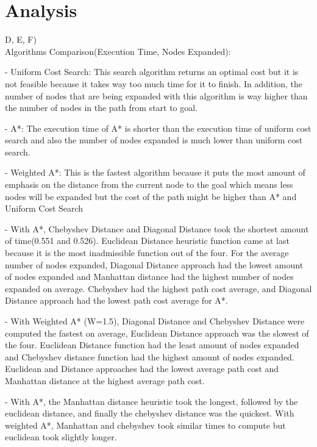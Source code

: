 \documentclass{report}
\begin{document}
    \section {Analysis}

        {\huge D, E, F)} \\
        Algorithms Comparison(Execution Time, Nodes Expanded):

        - Uniform Cost Search: This search algorithm returns an optimal cost but it is not feasible because it takes way too much time for it to finish. In addition, the number of nodes that are being expanded with this algorithm is way higher than the number of nodes in the path from start to goal.


        - A*: The execution time of A* is shorter than the execution time of uniform cost search and also the number of nodes expanded is much lower than uniform cost search.

        - Weighted A*: This is the fastest algorithm because it puts the most amount of emphasis on the distance from the current node to the goal which means less nodes will be expanded but the cost of the path might be higher than A* and Uniform Cost Search

        - With A*, Chebyshev Distance and Diagonal Distance took the shortest amount of time(0.551 and 0.526). Euclidean Distance heuristic function came at last because it is the most inadmissible function out of the four. For the average number of nodes expanded, Diagonal Distance approach had the lowest amount of nodes expanded and Manhattan distance had the highest number of nodes expanded on average. Chebyshev had the highest path cost average, and Diagonal Distance approach had the lowest path cost average for A*.


        - With Weighted A* (W=1.5), Diagonal Distance and Chebyshev Distance were computed the fastest on average, Euclidean Distance approach was the slowest of the four. Euclidean Distance function had the least amount of nodes expanded and Chebyshev distance function had the highest amount of nodes expanded. Euclidean and Distance approaches had the lowest average path cost and Manhattan distance at the highest average path cost.

        - With A*, the Manhattan distance heuristic took the longest, followed by the euclidean distance, and finally the chebyshev distance was the quickest. With weighted A*, Manhattan and chebyshev took similar times to compute but euclidean took slightly longer.
\end{document}
